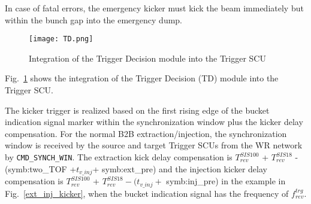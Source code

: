In case of fatal errors, the emergency kicker must kick the beam immediately but within the bunch gap into the emergency dump.

%
 \begin{figure}[!htb]
   \centering   
   \texttt{[image: TD.png]}
   \caption{Integration of the Trigger Decision module into the Trigger SCU}
   \label{TD}
\end{figure}
Fig.~\ref{TD} shows the integration of the Trigger Decision (\gls{TD}) module into the Trigger SCU.  

The kicker trigger is realized based on the first rising edge of the bucket indication signal marker within the synchronization window plus the kicker delay compensation. For the normal B2B extraction/injection, the synchronization window is received by the source and target Trigger SCUs from the WR network by \verb|CMD_SYNCH_WIN|. The extraction kick delay compensation is $T_{\mathit{rev}}^{\mathit{SIS100}}$ + $T_{\mathit{rev}}^{\mathit{SIS18}}$ -(\gls{symb:two_TOF} +$ t_{v\_inj}$+ \gls{symb:ext_pre}) and the injection kicker delay compensation is $T_{\mathit{rev}}^{\mathit{SIS100}}$ + $T_{\mathit{rev}}^{\mathit{SIS18}} - (t_{v\_inj}+$ \gls{symb:inj_pre}) in the example in Fig.~\ref{ext_inj_kicker}, when the bucket indication signal has the frequency of $f_{\mathit{rev}}^{\mathit{trg}}$. 


